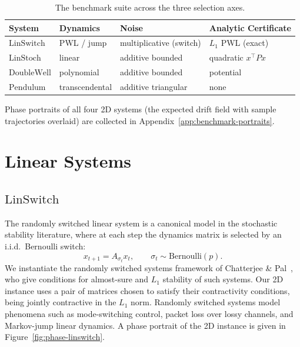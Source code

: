 \begin{table}[h]
\centering
\caption{The benchmark suite across the three selection axes.}
\label{tab:bench-suite}
\begin{tabular}{llll}
\hline
\textbf{System} & \textbf{Dynamics} & \textbf{Noise} & \textbf{Analytic Certificate} \\
\hline
$\mathrm{LinSwitch}$    & PWL / jump     & multiplicative (switch) & $L_1$ PWL (exact)  \\
$\mathrm{LinStoch}$   & linear         & additive bounded        & quadratic $x^\top P x$ \\
$\mathrm{DoubleWell}$        & polynomial     & additive bounded        & potential\\
$\mathrm{Pendulum}$     & transcendental & additive triangular     & none \\
\hline
\end{tabular}
\end{table}

Phase portraits of all four 2D systems (the expected drift field with sample
trajectories overlaid) are collected in Appendix~\ref{app:benchmark-portraits}.

\section{Linear Systems}
\label{sec:bench-linear}

\subsection{$\mathrm{LinSwitch}$}
\label{sec:bench-switched}

The randomly switched linear system is a canonical model in the stochastic
stability literature, where at each step the dynamics matrix is selected by an
i.i.d.\ Bernoulli switch:
\[
  x_{t+1} = A_{\sigma_t} x_t, \qquad \sigma_t \sim \text{Bernoulli}(p).
\]
We instantiate the randomly switched systems framework of Chatterjee \&
Pal~\cite{chatterjee2009excursion}, who give conditions for almost-sure and
$L_1$ stability of such systems. Our 2D instance uses a pair of matrices chosen
to satisfy their contractivity conditions, being jointly contractive in the
$L_1$ norm. Randomly switched systems model phenomena such as mode-switching
control, packet loss over lossy channels, and Markov-jump linear dynamics. A
phase portrait of the 2D instance is given in Figure~\ref{fig:phase-linswitch}.

